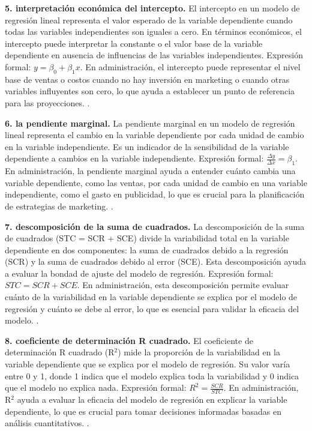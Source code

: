{\textbf{5. interpretación económica del intercepto.} El intercepto en un modelo de regresión lineal representa el valor esperado de la variable dependiente cuando todas las variables independientes son iguales a cero. En términos económicos, el intercepto puede interpretar la constante o el valor base de la variable dependiente en ausencia de influencias de las variables independientes. Expresión formal: $y = \beta_0 + \beta_1x$. En administración, el intercepto puede representar el nivel base de ventas o costos cuando no hay inversión en marketing o cuando otras variables influyentes son cero, lo que ayuda a establecer un punto de referencia para las proyecciones. \citep{anderson2012,lind2012,wackerly2010}.

\textbf{6. la pendiente marginal.} La pendiente marginal en un modelo de regresión lineal representa el cambio en la variable dependiente por cada unidad de cambio en la variable independiente. Es un indicador de la sensibilidad de la variable dependiente a cambios en la variable independiente. Expresión formal: $\frac{\Delta y}{\Delta x} = \beta_1$. En administración, la pendiente marginal ayuda a entender cuánto cambia una variable dependiente, como las ventas, por cada unidad de cambio en una variable independiente, como el gasto en publicidad, lo que es crucial para la planificación de estrategias de marketing. \citep{anderson2012,lind2012,wackerly2010}.

\textbf{7. descomposición de la suma de cuadrados.} La descomposición de la suma de cuadrados (STC = SCR + SCE) divide la variabilidad total en la variable dependiente en dos componentes: la suma de cuadrados debido a la regresión (SCR) y la suma de cuadrados debido al error (SCE). Esta descomposición ayuda a evaluar la bondad de ajuste del modelo de regresión. Expresión formal: $STC = SCR + SCE$. En administración, esta descomposición permite evaluar cuánto de la variabilidad en la variable dependiente se explica por el modelo de regresión y cuánto se debe al error, lo que es esencial para validar la eficacia del modelo. \citep{anderson2012,lind2012,wackerly2010}.

\textbf{8. coeficiente de determinación R cuadrado.} El coeficiente de determinación R cuadrado (R$^2$) mide la proporción de la variabilidad en la variable dependiente que se explica por el modelo de regresión. Su valor varía entre 0 y 1, donde 1 indica que el modelo explica toda la variabilidad y 0 indica que el modelo no explica nada. Expresión formal: $R^2 = \frac{SCR}{STC}$. En administración, R$^2$ ayuda a evaluar la eficacia del modelo de regresión en explicar la variable dependiente, lo que es crucial para tomar decisiones informadas basadas en análisis cuantitativos. \citep{anderson2012,lind2012,wackerly2010}.


}
